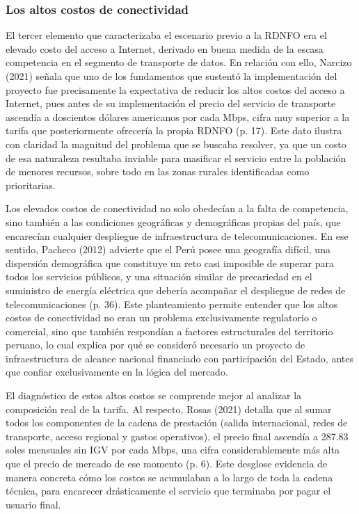 \subsubsection{Los altos costos de conectividad}
El tercer elemento que caracterizaba el escenario previo a la RDNFO era el elevado costo del acceso a Internet, derivado en buena medida de la escasa competencia en el segmento de transporte de datos. En relación con ello, Narcizo (2021) señala que uno de los fundamentos que sustentó la implementación del proyecto fue precisamente la expectativa de reducir los altos costos del acceso a Internet, pues antes de su implementación el precio del servicio de transporte ascendía a doscientos dólares americanos por cada Mbps, cifra muy superior a la tarifa que posteriormente ofrecería la propia RDNFO (p. 17). Este dato ilustra con claridad la magnitud del problema que se buscaba resolver, ya que un costo de esa naturaleza resultaba inviable para masificar el servicio entre la población de menores recursos, sobre todo en las zonas rurales identificadas como prioritarias.

Los elevados costos de conectividad no solo obedecían a la falta de competencia, sino también a las condiciones geográficas y demográficas propias del país, que encarecían cualquier despliegue de infraestructura de telecomunicaciones. En ese sentido, Pacheco (2012) advierte que el Perú posee una geografía difícil, una dispersión demográfica que constituye un reto casi imposible de superar para todos los servicios públicos, y una situación similar de precariedad en el suministro de energía eléctrica que debería acompañar el despliegue de redes de telecomunicaciones (p. 36). Este planteamiento permite entender que los altos costos de conectividad no eran un problema exclusivamente regulatorio o comercial, sino que también respondían a factores estructurales del territorio peruano, lo cual explica por qué se consideró necesario un proyecto de infraestructura de alcance nacional financiado con participación del Estado, antes que confiar exclusivamente en la lógica del mercado.

El diagnóstico de estos altos costos se comprende mejor al analizar la composición real de la tarifa. Al respecto, Rosas (2021) detalla que al sumar todos los componentes de la cadena de prestación (salida internacional, redes de transporte, acceso regional y gastos operativos), el precio final ascendía a 287.83 soles mensuales sin IGV por cada Mbps, una cifra considerablemente más alta que el precio de mercado de ese momento (p. 6). Este desglose evidencia de manera concreta cómo los costos se acumulaban a lo largo de toda la cadena técnica, para encarecer drásticamente el servicio que terminaba por pagar el usuario final.


